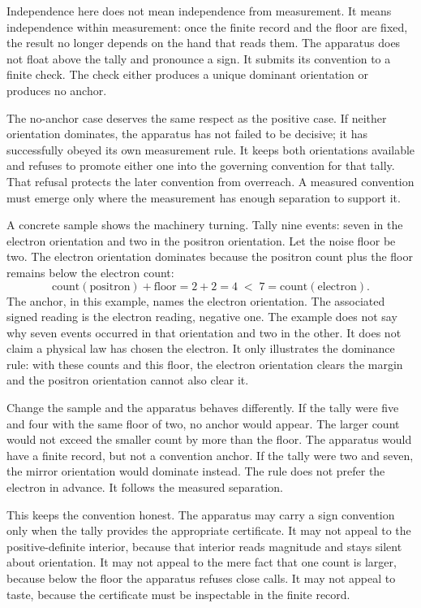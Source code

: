 Independence here does not mean independence from measurement. It means
independence within measurement: once the finite record and the floor are fixed,
the result no longer depends on the hand that reads them. The apparatus does
not float above the tally and pronounce a sign. It submits its convention to a
finite check. The check either produces a unique dominant orientation or
produces no anchor.

The no-anchor case deserves the same respect as the positive case. If neither
orientation dominates, the apparatus has not failed to be decisive; it has
successfully obeyed its own measurement rule. It keeps both orientations
available and refuses to promote either one into the governing convention for
that tally. That refusal protects the later convention from overreach. A
measured convention must emerge only where the measurement has enough
separation to support it.

A concrete sample shows the machinery turning. Tally nine events: seven in the
electron orientation and two in the positron orientation. Let the noise floor
be two. The electron orientation dominates because the positron count plus the
floor remains below the electron count:
\[
  \mathrm{count}(\text{positron}) + \text{floor} = 2 + 2 = 4 \;<\; 7 = \mathrm{count}(\text{electron}).
\]
The anchor, in this example, names the electron orientation. The associated
signed reading is the electron reading, negative one. The example does not say
why seven events occurred in that orientation and two in the other. It does not
claim a physical law has chosen the electron. It only illustrates the
dominance rule: with these counts and this floor, the electron orientation
clears the margin and the positron orientation cannot also clear it.

Change the sample and the apparatus behaves differently. If the tally were
five and four with the same floor of two, no anchor would appear. The larger
count would not exceed the smaller count by more than the floor. The apparatus
would have a finite record, but not a convention anchor. If the tally were two
and seven, the mirror orientation would dominate instead. The rule does not
prefer the electron in advance. It follows the measured separation.

This keeps the convention honest. The apparatus may carry a sign convention
only when the tally provides the appropriate certificate. It may not appeal to
the positive-definite interior, because that interior reads magnitude and stays
silent about orientation. It may not appeal to the mere fact that one count is
larger, because below the floor the apparatus refuses close calls. It may not
appeal to taste, because the certificate must be inspectable in the finite
record.

